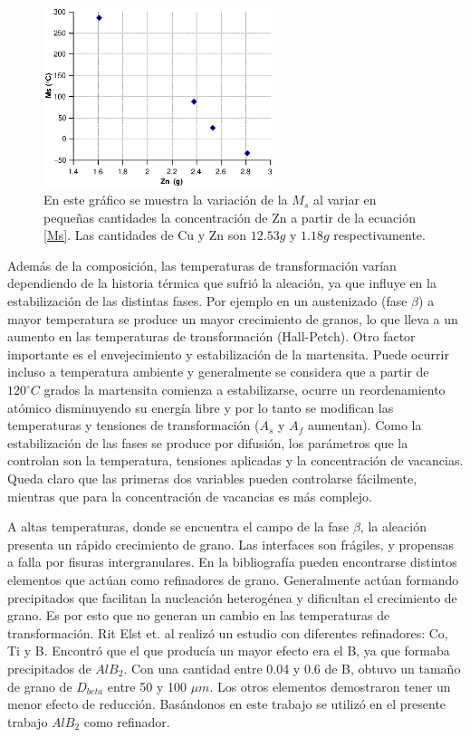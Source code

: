 \documentclass[a4paper,12pt,fleqn,twoside,openany]{book}
\begin{document}
\begin{figure}[h]
 \centering
 \includegraphics[width=0.6\textwidth]{Img/Introduccion/MsZn2.eps}
 \caption{En este gráfico se muestra la variación de la $M_s$ al variar en pequeñas cantidades la concentración de Zn a partir de la ecuación \ref{Ms}. Las cantidades de Cu y Zn son $12.53 g$ y $1.18 g$ respectivamente.}
  
\end{figure}


Además de la composición, las temperaturas de transformación varían dependiendo de la historia térmica que sufrió la aleación, ya que influye en la estabilización 
de las distintas fases. Por ejemplo en un austenizado (fase $\beta$) a mayor temperatura se produce un mayor crecimiento de granos, lo que lleva a un aumento en las 
temperaturas de transformación (Hall-Petch). Otro factor importante es el envejecimiento y estabilización de la martensita. Puede ocurrir incluso a temperatura ambiente y generalmente se considera que a partir de $120^\circ C $ grados la martensita comienza 
a estabilizarse, ocurre un reordenamiento atómico disminuyendo su energía libre y por lo tanto se modifican las temperaturas y tensiones de transformación ($A_s$ y $A_f$ aumentan). Como la estabilización 
de las fases se produce por difusión, los parámetros que la controlan son la temperatura, tensiones aplicadas y la concentración de vacancias. Queda claro que las 
primeras dos variables pueden controlarse fácilmente, mientras que para la concentración de vacancias es más complejo.

A altas temperaturas, donde se encuentra el campo de la fase $\beta$, la aleación presenta un rápido crecimiento de grano. Las interfaces son frágiles, y propensas 
a falla por fisuras intergranulares. En la bibliografía pueden encontrarse distintos elementos que actúan como refinadores de grano. Generalmente actúan formando 
precipitados que facilitan la nucleación heterogénea y dificultan el crecimiento de grano. Es por esto que no generan un cambio en las temperaturas de 
transformación. Rit Elst et. al \cite{ritelst} realizó un estudio con diferentes refinadores: Co, Ti y B. Encontró que el que producía un mayor efecto era el B, 
ya que formaba precipitados de $AlB_{2}$. Con una cantidad entre 0.04 y 0.6 de B, obtuvo un tamaño de grano de $D_{beta}$ entre 50 y 100 $\mu m$. Los otros elementos 
demostraron tener un menor efecto de reducción. Basándonos en este trabajo se utilizó en el presente trabajo $AlB_{2}$ como refinador.
\end{document}
